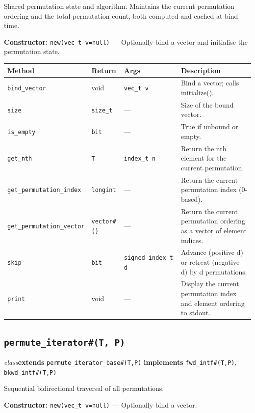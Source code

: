 \documentclass[11pt,letterpaper]{report}
\begin{document}
Shared permutation state and algorithm. Maintains the current permutation ordering and the total permutation count, both computed and cached at bind time.

\noindent\textbf{Constructor:} \texttt{new(vec\_t v=null)} --- Optionally bind a vector and initialise the permutation state.

\begin{xltabular}{\linewidth}{>{\small}p{1.35in} >{\small}p{1.25in} >{\small}p{0.95in} >{\small}X}
\toprule
\textbf{Method} & \textbf{Return} & \textbf{Args} & \textbf{Description} \\
\midrule
\endhead
\bottomrule
\endfoot
\texttt{bind\_vector} & void & \texttt{vec\_t v} & Bind a vector; calls initialize(). \\
\texttt{size} & \texttt{size\_t} & --- & Size of the bound vector. \\
\texttt{is\_empty} & \texttt{bit} & --- & True if unbound or empty. \\
\texttt{get\_nth} & \texttt{T} & \texttt{index\_t n} & Return the nth element for the current permutation. \\
\texttt{get\_permutation\_index} & \texttt{longint} & --- & Return the current permutation index (0-based). \\
\texttt{get\_permutation\_vector} & \texttt{vector\#()} & --- & Return the current permutation ordering as a vector of element indices. \\
\texttt{skip} & \texttt{bit} & \texttt{signed\_index\_t d} & Advance (positive d) or retreat (negative d) by d permutations. \\
\texttt{print} & void & --- & Display the current permutation index and element ordering to stdout. \\
\end{xltabular}

\subsection*{\texttt{permute\_iterator\#(T, P)}}
\noindent\small\textit{class}\quad \textbf{extends} \texttt{permute\_iterator\_base\#(T,P)} \quad \textbf{implements} \texttt{fwd\_intf\#(T,P)}, \texttt{bkwd\_intf\#(T,P)}\par

Sequential bidirectional traversal of all permutations.

\noindent\textbf{Constructor:} \texttt{new(vec\_t v=null)} --- Optionally bind a vector.
\end{document}
